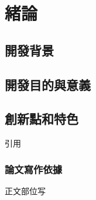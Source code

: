 \chapter{緒論}
\section{開發背景}
\section{開發目的與意義}
\section{創新點和特色}
\citep{abdoh2019} 引用
\subsection{論文寫作依據}
正文部位写
